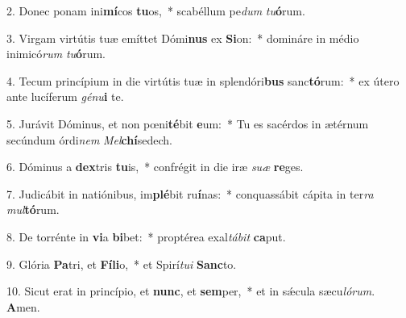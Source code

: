 2. Donec ponam ini\textbf{mí}cos \textbf{tu}os,~*  scabéllum pe\textit{dum} \textit{tu}\textbf{ó}rum.\

3. Virgam virtútis tuæ emíttet Dómi\textbf{nus} ex \textbf{Si}on:~*  domináre in médio inimicó\textit{rum} \textit{tu}\textbf{ó}rum.\

4. Tecum princípium in die virtútis tuæ in splendóri\textbf{bus} sanc\textbf{tó}rum:~*  ex útero ante lucíferum \textit{gé}\textit{nu}\textbf{i} te.\

5. Jurávit Dóminus, et non pœni\textbf{té}bit \textbf{e}um:~*  Tu es sacérdos in ætérnum secúndum órdi\textit{nem} \textit{Mel}\textbf{chí}sedech.\

6. Dóminus a \textbf{dex}tris \textbf{tu}is,~*  confrégit in die iræ \textit{su}\textit{æ} \textbf{re}ges.\

7. Judicábit in natiónibus, im\textbf{plé}bit ru\textbf{í}nas:~*  conquassábit cápita in ter\textit{ra} \textit{mul}\textbf{tó}rum.\

8. De torrénte in \textbf{vi}a \textbf{bi}bet:~*  proptérea exal\textit{tá}\textit{bit} \textbf{ca}put.\

9. Glória \textbf{Pa}tri, et \textbf{Fí}\textbf{li}o,~*  et Spirí\textit{tu}\textit{i} \textbf{Sanc}to.\

10. Sicut erat in princípio, et \textbf{nunc}, et \textbf{sem}per,~*  et in sǽcula sæcu\textit{ló}\textit{rum}. \textbf{A}men.\

